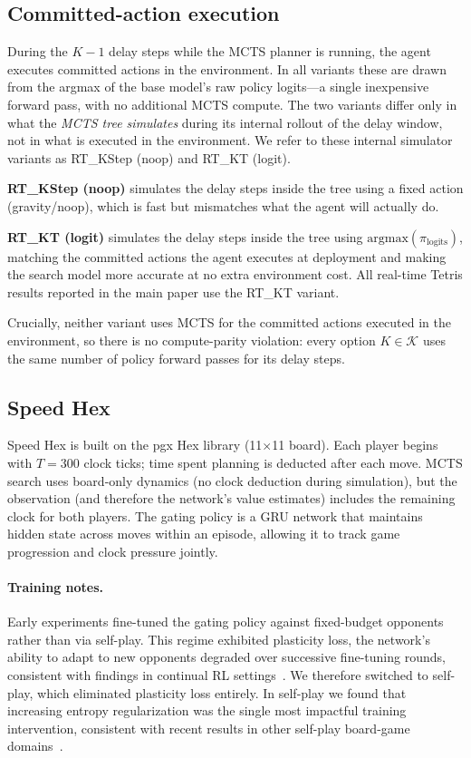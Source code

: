 \documentclass{article}
\newcommand{\Kset}{\mathcal{K}}
\begin{document}
\subsection{Committed-action execution}
\label{app:committed_action}

During the $K{-}1$ delay steps while the MCTS planner is running, the agent executes
committed actions in the environment.
In all variants these are drawn from the argmax of the base model's raw policy
logits---a single inexpensive forward pass, with no additional MCTS compute.
The two variants differ only in what the \emph{MCTS tree simulates} during its internal
rollout of the delay window, not in what is executed in the environment.
We refer to these internal simulator variants as RT\_KStep (noop) and
RT\_KT (logit).

\textbf{RT\_KStep (noop)} simulates the delay steps inside the tree using a fixed
action (gravity/noop), which is fast but mismatches what the agent will actually do.

\textbf{RT\_KT (logit)} simulates the delay steps inside the tree using
$\mathrm{argmax}(\pi_{\mathrm{logits}})$, matching the committed actions the agent
executes at deployment and making the search model more accurate at no extra
environment cost.
All real-time Tetris results reported in the main paper use the RT\_KT variant.

Crucially, neither variant uses MCTS for the committed actions executed in the
environment, so there is no compute-parity violation: every option $K \in \Kset$
uses the same number of policy forward passes for its delay steps.

\subsection{Speed Hex}
Speed Hex is built on the pgx Hex library (11$\times$11 board).
Each player begins with $T = 300$ clock ticks; time spent planning is deducted after
each move.
MCTS search uses board-only dynamics (no clock deduction during simulation), but the
observation (and therefore the network's value estimates) includes the remaining
clock for both players.
The gating policy is a GRU network that maintains hidden state across moves within an
episode, allowing it to track game progression and clock pressure jointly.

\paragraph{Training notes.}
Early experiments fine-tuned the gating policy against fixed-budget opponents rather
than via self-play.
This regime exhibited plasticity loss, the network's ability to adapt to new opponents
degraded over successive fine-tuning rounds, consistent with findings in continual RL
settings~\citep{muppidi2024fast, boopathy2024permutation}.
We therefore switched to self-play, which eliminated plasticity loss entirely.
In self-play we found that increasing entropy regularization was the single most
impactful training intervention, consistent with recent results in other self-play
board-game domains~\citep{forkel2025entropy}.
\end{document}
